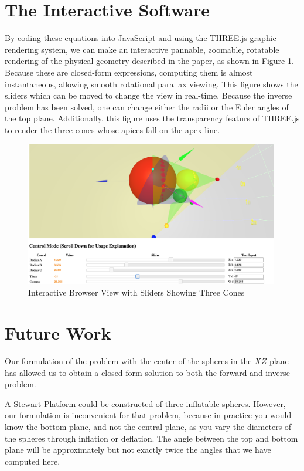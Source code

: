 \documentclass{article}
\begin{document}
\section{The Interactive Software}

By coding these equations into JavaScript and using the THREE.js
graphic rendering system, we can make an interactive pannable, zoomable, rotatable
rendering of the physical geometry described in the paper, as
shown in Figure \ref{fig:threecones}.
Because these are closed-form expressions, computing them is almost
instantaneous, allowing smooth rotational parallax viewing.
This  figure shows the sliders which can be moved to change the view
in real-time. Because the inverse problem has been solved, one can
change either the radii or the Euler angles of the top plane.
Additionally, this figure uses the transparency featurs of THREE.js to
render the three cones whose apices fall on the apex line.

\begin{figure}
     \centering
     \includegraphics[width=0.99\textwidth]{figures/ThreeCones.png}
     \caption{Interactive Browser View with Sliders Showing Three Cones}
  \label{fig:threecones}
\end{figure}


\section{Future Work}

Our formulation of the problem with the center of the spheres in the $XZ$
plane has allowed us to obtain a closed-form solution to both the forward
and inverse problem.

A Stewart Platform could be constructed of three inflatable spheres.
However, our formulation is inconvenient for that problem, because
in practice you would know the bottom plane, and not the central plane,
as you vary the diameters of the spheres through inflation or deflation.
The angle between the top and bottom plane will be approximately but not
exactly twice the angles that we have computed here.
\end{document}
